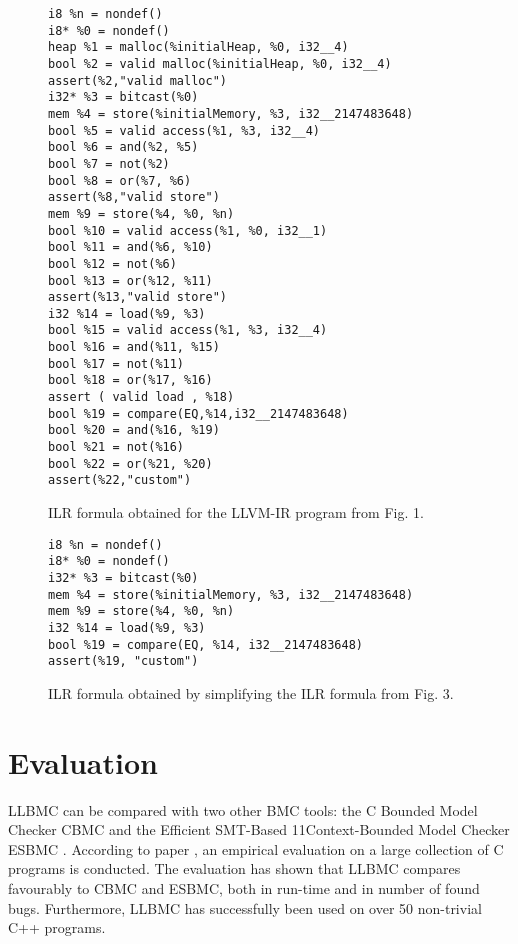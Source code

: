 \documentclass[14pt]{article}
\begin{document}
{\begin{figure}[ht]
\centering
\begin{minipage}[t]{0.45\linewidth}
\begin{lstlisting}
i8 %n = nondef()
i8* %0 = nondef()
heap %1 = malloc(%initialHeap, %0, i32__4)
bool %2 = valid malloc(%initialHeap, %0, i32__4)
assert(%2,"valid malloc")
i32* %3 = bitcast(%0)
mem %4 = store(%initialMemory, %3, i32__2147483648)
bool %5 = valid access(%1, %3, i32__4)
bool %6 = and(%2, %5)
bool %7 = not(%2)
bool %8 = or(%7, %6)
assert(%8,"valid store")
mem %9 = store(%4, %0, %n)
bool %10 = valid access(%1, %0, i32__1)
bool %11 = and(%6, %10)
bool %12 = not(%6)
bool %13 = or(%12, %11)
assert(%13,"valid store")
i32 %14 = load(%9, %3)
bool %15 = valid access(%1, %3, i32__4)
bool %16 = and(%11, %15)
bool %17 = not(%11)
bool %18 = or(%17, %16)
assert ( valid load , %18)
bool %19 = compare(EQ,%14,i32__2147483648)
bool %20 = and(%16, %19)
bool %21 = not(%16)
bool %22 = or(%21, %20)
assert(%22,"custom")

\end{lstlisting}
\end{minipage}
\caption{ ILR formula obtained for the LLVM-IR program from Fig. 1.}
\end{figure}


\begin{figure}[ht]
\centering
\begin{minipage}[t]{0.45\linewidth}
\begin{lstlisting}
i8 %n = nondef()
i8* %0 = nondef()
i32* %3 = bitcast(%0)
mem %4 = store(%initialMemory, %3, i32__2147483648)
mem %9 = store(%4, %0, %n)
i32 %14 = load(%9, %3)
bool %19 = compare(EQ, %14, i32__2147483648)
assert(%19, "custom")

\end{lstlisting}
\end{minipage}
\caption{ ILR formula obtained by simplifying the ILR formula from Fig. 3.}
\end{figure}

  
\section{Evaluation}\label{Evaluation}
LLBMC can be compared with two other BMC tools: the C Bounded Model Checker CBMC  \cite{CBMC} and the Efficient SMT-Based
11Context-Bounded Model Checker ESBMC  \cite{ESBMC}. According to paper \cite{llbmc0},  an empirical evaluation on a large collection of C programs is conducted. The evaluation has shown that LLBMC compares favourably to CBMC and ESBMC, both in run-time and in number of found bugs. Furthermore, LLBMC has successfully been used on over 50 non-trivial C++ programs. 


}
\end{document}

